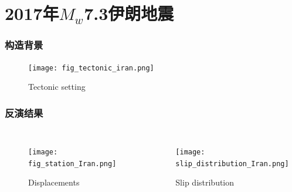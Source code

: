 ﻿\documentclass{beamer}
\begin{document}
\section{2017年$M_w$7.3伊朗地震}
\begin{frame}
\frametitle{构造背景}
\begin{figure}
  \centering
  \texttt{[image: fig\_tectonic\_iran.png]}\\
  \caption{Tectonic setting}\label{fig_tectonic_iran}
\end{figure}
\end{frame}
\begin{frame}
\frametitle{反演结果}
\begin{columns}

\begin{minipage}[c][0.4\textheight][c]{\linewidth}
\begin{figure}
  \centering
  \texttt{[image: fig\_station\_Iran.png]}\\
  \caption{Displacements}\label{fig_station_Iran}
\end{figure}
\end{minipage}

\begin{minipage}[c][0.4\textheight][c]{\linewidth}
\begin{figure}
  \centering
  \texttt{[image: slip\_distribution\_Iran.png]}\\
  \caption{Slip distribution}\label{Fig:slip_distribution_Iran}
\end{figure}
\end{minipage}

\end{columns}

\end{frame}
\end{document}
